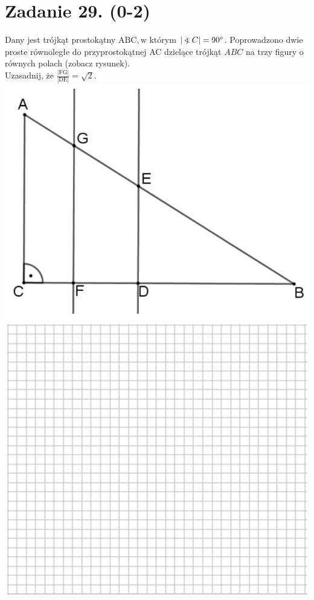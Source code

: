 \documentclass[10pt]{article}
\newcommand\Varangle{\mathop{{<\!\!\!\!\!\text{\small)}}\:}\nolimits}
\begin{document}
\section*{Zadanie 29. (0-2)}
Dany jest trójkąt prostokątny \(\mathrm{ABC}, \mathrm{w}\) którym \(|\Varangle C|=90^{\circ}\). Poprowadzono dwie proste równoległe do przyprostokątnej AC dzielące trójkąt \(A B C\) na trzy figury o równych polach (zobacz rysunek).\\
Uzasadnij, że \(\frac{|\mathrm{FG}|}{|\mathrm{DE}|}=\sqrt{2}\).\\
\includegraphics[max width=\textwidth, center]{2024_11_21_ba65d61981011633d840g-13}\\
\includegraphics[max width=\textwidth, center]{2024_11_21_ba65d61981011633d840g-13(1)}
\end{document}
